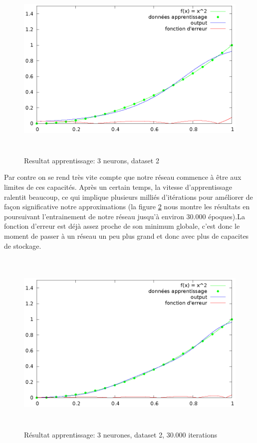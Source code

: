 \documentclass[twoside,openright,a4paper,11pt,french]{article}
\begin{document}
\begin{figure}[ht]
\centering
\includegraphics[width=12cm,height=9cm]{./pics/chartsqtest2.eps}
\caption{Resultat apprentissage: 3 neurons, dataset 2}
\label{fig:chartsqtest2}
\end{figure}

Par contre on se rend très vite compte que notre réseau commence à être aux limites
de ces capacités.
Après un certain temps, la vitesse d'apprentissage ralentit beaucoup, 
ce qui implique plusieurs milliés d'itérations pour améliorer de façon 
significative notre approximations (la figure \ref{fig:chartsqtest3} nous
montre les résultats en poursuivant l'entrainement de notre réseau jusqu'à
environ 30.000 époques).La fonction d'erreur est déjà assez proche de son minimum 
globale, c'est donc le moment de passer à un réseau un peu plus grand
et donc avec plus de capacites de stockage.


\begin{figure}[ht]
\centering
\includegraphics[width=12cm,height=9cm]{./pics/chartsqtest3.eps}
\caption{Résultat apprentissage: 3 neurones, dataset 2, 30.000 iterations}
\label{fig:chartsqtest3}
\end{figure}
\end{document}
